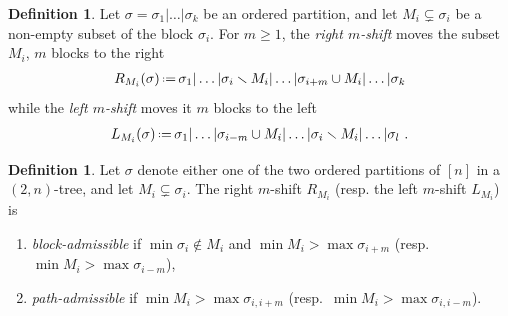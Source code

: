 \documentclass{amsart}
\newcommand{\darkblue}{\color{darkblue}} %
\theoremstyle{definition}
\newtheorem{definition}[theorem]{Definition}
\newcommand{\ssm}{\smallsetminus} %
\newcommand{\eqdef}{\mbox{\,\raisebox{0.2ex}{\scriptsize\ensuremath{\mathrm:}}\ensuremath{=}\,}} %
\newcommand{\defn}[1]{\textsl{\darkblue #1}} %
\begin{document}
\begin{definition}
\label{def:subset shifts}
Let $\sigma=\sigma_1|\dots|\sigma_k$ be an ordered partition, and let 
$M_i\subsetneq \sigma_{i}$ be a non-empty subset of the block $\sigma_i$.
For $m\geq 1$, the \defn{right $m$-shift} moves the subset $M_i$, $m$ blocks to the right  
\begin{align*}
    R_{M_i}(\sigma) \eqdef \sigma_1|\dots|\sigma_i \ssm M_i|\dots | \sigma_{i+m} \cup M_i|\dots|\sigma_k
\end{align*}
while the \defn{left $m$-shift} moves it $m$ blocks to the left 
\begin{align*}
    L_{M_{i}}(\sigma) \eqdef \sigma_1|\dots|\sigma_{i-m} \cup M_{i}| \dots |\sigma_{i} \ssm M_{i}|\dots|\sigma_l \ .
\end{align*}
\end{definition}

\begin{definition}
\label{def:movable-subsets}
Let $\sigma$ denote either one of the two ordered partitions of $[n]$ in a $(2,n)$-tree, and let $M_i \subsetneq \sigma_i$.
The right $m$-shift $R_{M_i}$ (resp. the left $m$-shift $L_{M_{i}}$) is 
\begin{enumerate}
    \item \defn{block-admissible} if $\min \sigma_i \notin M_i$ and $\min M_i> \max \sigma_{i+m}$ (resp.~$\min M_{i}> \max \sigma_{i-m}$),
    \item \defn{path-admissible} if $\min M_i> \max \sigma_{i,i+m}$ (resp.~$\min M_{i}> \max \sigma_{i,i-m}$).
\end{enumerate}
\end{definition}
\end{document}
